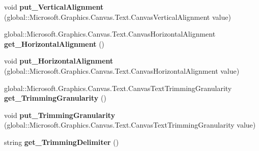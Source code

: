 \begin{DoxyCompactItemize}
\item 
\mbox{\label{interface_microsoft_1_1_graphics_1_1_canvas_1_1_text_1_1_i_canvas_text_layout_a739a2321aadcdbc5778eb75fff7a82d6}} 
void {\bfseries put\+\_\+\+Vertical\+Alignment} (global\+::\+Microsoft.\+Graphics.\+Canvas.\+Text.\+Canvas\+Vertical\+Alignment value)
\item 
\mbox{\label{interface_microsoft_1_1_graphics_1_1_canvas_1_1_text_1_1_i_canvas_text_layout_a0eca2347bb72344130499308b22b5c75}} 
global\+::\+Microsoft.\+Graphics.\+Canvas.\+Text.\+Canvas\+Horizontal\+Alignment {\bfseries get\+\_\+\+Horizontal\+Alignment} ()
\item 
\mbox{\label{interface_microsoft_1_1_graphics_1_1_canvas_1_1_text_1_1_i_canvas_text_layout_a1ed48a95cc077705f220f440b7d0ec96}} 
void {\bfseries put\+\_\+\+Horizontal\+Alignment} (global\+::\+Microsoft.\+Graphics.\+Canvas.\+Text.\+Canvas\+Horizontal\+Alignment value)
\item 
\mbox{\label{interface_microsoft_1_1_graphics_1_1_canvas_1_1_text_1_1_i_canvas_text_layout_a0e97f065a5957e5937f383d4e8676d1f}} 
global\+::\+Microsoft.\+Graphics.\+Canvas.\+Text.\+Canvas\+Text\+Trimming\+Granularity {\bfseries get\+\_\+\+Trimming\+Granularity} ()
\item 
\mbox{\label{interface_microsoft_1_1_graphics_1_1_canvas_1_1_text_1_1_i_canvas_text_layout_a6159ff2880908ea328720398d78bb388}} 
void {\bfseries put\+\_\+\+Trimming\+Granularity} (global\+::\+Microsoft.\+Graphics.\+Canvas.\+Text.\+Canvas\+Text\+Trimming\+Granularity value)
\item 
\mbox{\label{interface_microsoft_1_1_graphics_1_1_canvas_1_1_text_1_1_i_canvas_text_layout_ae248cefb5cdb08879e9a5324630e97d6}} 
string {\bfseries get\+\_\+\+Trimming\+Delimiter} ()
\item 
\mbox{\label{interface_microsoft_1_1_graphics_1_1_canvas_1_1_text_1_1_i_canvas_text_layout_a98a50566a034e585369dc4b5b61fca2b}} 

\end{DoxyCompactItemize}
